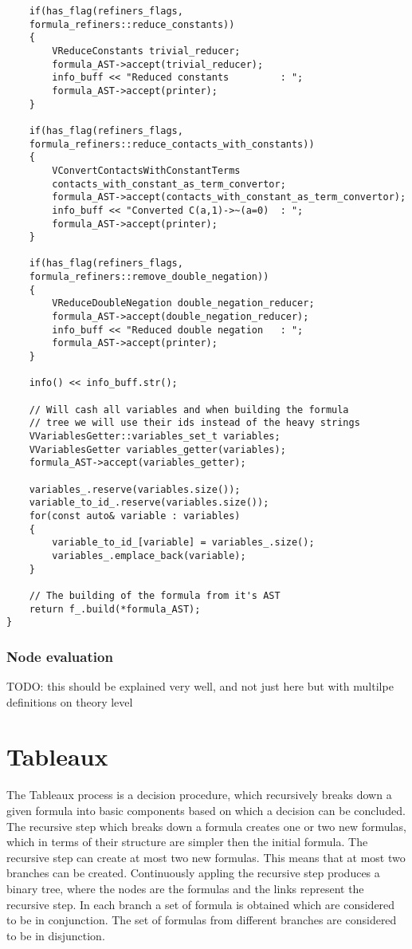 \documentclass{article}
\begin{document}
\begin{lstlisting}
    if(has_flag(refiners_flags, 
	formula_refiners::reduce_constants))
    {
        VReduceConstants trivial_reducer;
        formula_AST->accept(trivial_reducer);
        info_buff << "Reduced constants         : ";
        formula_AST->accept(printer);
    }

    if(has_flag(refiners_flags, 
	formula_refiners::reduce_contacts_with_constants))
    {
        VConvertContactsWithConstantTerms 
		contacts_with_constant_as_term_convertor;
        formula_AST->accept(contacts_with_constant_as_term_convertor);
        info_buff << "Converted C(a,1)->~(a=0)  : ";
        formula_AST->accept(printer);
    }

    if(has_flag(refiners_flags, 
	formula_refiners::remove_double_negation))
    {
        VReduceDoubleNegation double_negation_reducer;
        formula_AST->accept(double_negation_reducer);
        info_buff << "Reduced double negation   : ";
        formula_AST->accept(printer);
    }

    info() << info_buff.str();

    // Will cash all variables and when building the formula 
    // tree we will use their ids instead of the heavy strings
    VVariablesGetter::variables_set_t variables;
    VVariablesGetter variables_getter(variables);
    formula_AST->accept(variables_getter);

    variables_.reserve(variables.size());
    variable_to_id_.reserve(variables.size());
    for(const auto& variable : variables)
    {
        variable_to_id_[variable] = variables_.size();
        variables_.emplace_back(variable);
    }

    // The building of the formula from it's AST
    return f_.build(*formula_AST); 
}
			\end{lstlisting}

	\subsubsection*{Node evaluation}
		TODO: this should be explained very well, and not just here but with multilpe definitions on theory level
		
	\newpage
	\section{Tableaux}
	The Tableaux process is a decision procedure, which recursively breaks down a given formula into basic components 
	based on which a decision can be concluded. The recursive step which breaks down a formula creates one or two 
	new formulas, which in terms of their structure are simpler then the initial formula. The recursive step can create
	at most two new formulas. This means that at most two branches can be created. Continuously appling the recursive step produces a binary tree, where the nodes
	are the formulas and the links represent the recursive step.
	In each branch a set of formula is obtained which are considered to be in conjunction.
	The set of formulas from different branches are considered to be in disjunction.
\end{document}
